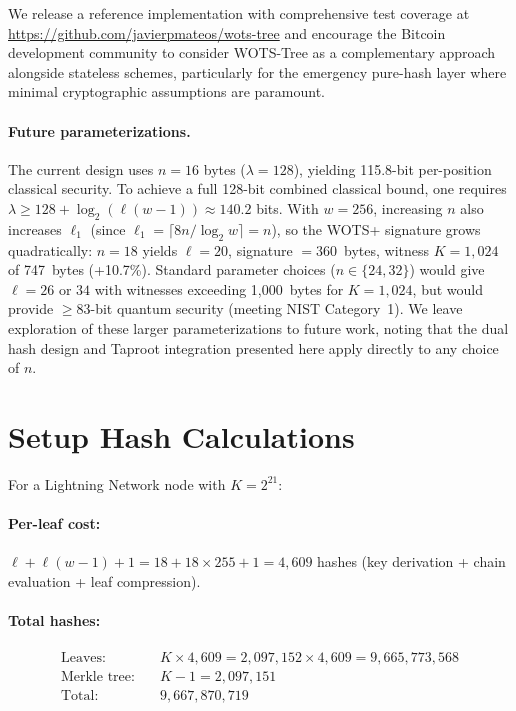 \documentclass[11pt,a4paper]{article}
\theoremstyle{definition}
\begin{document}
We release a reference implementation with comprehensive test coverage at \url{https://github.com/javierpmateos/wots-tree} and encourage the Bitcoin development community to consider WOTS-Tree as a complementary approach alongside stateless schemes, particularly for the emergency pure-hash layer where minimal cryptographic assumptions are paramount.

\paragraph{Future parameterizations.} The current design uses $n = 16$ bytes ($\lambda = 128$), yielding 115.8-bit per-position classical security. To achieve a full 128-bit combined classical bound, one requires $\lambda \geq 128 + \log_2(\ell(w-1)) \approx 140.2$ bits. With $w = 256$, increasing $n$ also increases $\ell_1$ (since $\ell_1 = \lceil 8n / \log_2 w \rceil = n$), so the WOTS+ signature grows quadratically: $n = 18$ yields $\ell = 20$, signature $= 360$~bytes, witness $K = 1{,}024$ of 747~bytes (+10.7\%). Standard parameter choices ($n \in \{24, 32\}$) would give $\ell = 26$ or $34$ with witnesses exceeding 1,000~bytes for $K = 1{,}024$, but would provide $\geq 83$-bit quantum security (meeting NIST Category~1). We leave exploration of these larger parameterizations to future work, noting that the dual hash design and Taproot integration presented here apply directly to any choice of $n$.

\appendix
\section{Setup Hash Calculations}
\label{app:hash-calc}

For a Lightning Network node with $K = 2^{21}$:

\paragraph{Per-leaf cost:} $\ell + \ell(w-1) + 1 = 18 + 18 \times 255 + 1 = 4{,}609$ hashes (key derivation + chain evaluation + leaf compression).

\paragraph{Total hashes:}
\begin{align*}
\text{Leaves:} \quad & K \times 4{,}609 = 2{,}097{,}152 \times 4{,}609 = 9{,}665{,}773{,}568 \\
\text{Merkle tree:} \quad & K - 1 = 2{,}097{,}151 \\
\text{Total:} \quad & 9{,}667{,}870{,}719
\end{align*}
\end{document}
